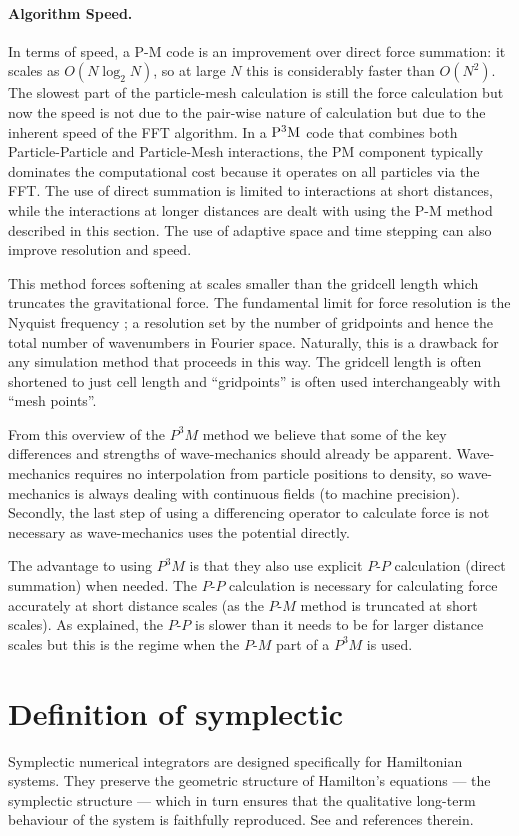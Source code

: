 \paragraph{Algorithm Speed.} In terms of speed, a P-M code is an improvement over direct force summation: it scales as $O(N \log_2 N)$, so at large $N$ this is considerably faster than $O(N^2)$. The slowest part of the particle-mesh calculation is still the force calculation but now the speed is not due to the pair-wise nature of calculation but due to the inherent speed of the FFT algorithm. In a ${\rm P^3 M}$ code that combines both Particle-Particle and Particle-Mesh interactions, the PM component typically dominates the computational cost because it operates on all particles via the FFT. The use of direct summation is limited to interactions at short distances, while the interactions at longer distances are dealt with using the P-M method described in this section. The use of adaptive space and time stepping can also improve resolution and speed. \citep{bib_aar, bib_nr}

This method forces softening at scales smaller than the gridcell length which truncates the gravitational force. The fundamental limit for force resolution is the Nyquist frequency \citep{bib_hmpc}; a resolution set by the number of gridpoints and hence the total number of wavenumbers in Fourier space. Naturally, this is a drawback for any simulation method that proceeds in this way. The gridcell length is often shortened to just cell length and ``gridpoints'' is often used interchangeably with ``mesh points''.

From this overview of the $P^3 M$ method we believe that some of the key differences and strengths of wave-mechanics should already be apparent. Wave-mechanics requires no interpolation from particle positions to density, so wave-mechanics is always dealing with continuous fields (to machine precision). Secondly, the last step of using a differencing operator to calculate force is not necessary as wave-mechanics uses the potential directly.

The advantage to using $P^3 M$ is that they also use explicit $P$-$P$ calculation (direct summation) when needed. The $P$-$P$ calculation is necessary for calculating force accurately at short distance scales (as the $P$-$M$ method is truncated at short scales). As explained, the $P$-$P$ is slower than it needs to be for larger distance scales but this is the regime when the $P$-$M$ part of a $P^3 M$ is used.

\section{Definition of symplectic}
\label{sec.sym}
Symplectic numerical integrators are designed specifically for Hamiltonian systems. They preserve the geometric structure of Hamilton's equations --- the symplectic structure --- which in turn ensures that the qualitative long-term behaviour of the system is faithfully reproduced. See \citep{bib_saha} and references therein.

